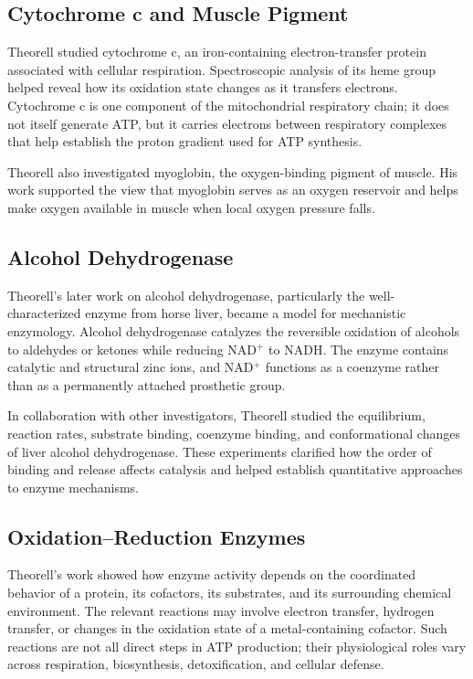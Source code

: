\subsection{Cytochrome c and Muscle Pigment}

Theorell studied cytochrome c, an iron-containing electron-transfer protein associated with cellular respiration. Spectroscopic analysis of its heme group helped reveal how its oxidation state changes as it transfers electrons. Cytochrome c is one component of the mitochondrial respiratory chain; it does not itself generate ATP, but it carries electrons between respiratory complexes that help establish the proton gradient used for ATP synthesis.

Theorell also investigated myoglobin, the oxygen-binding pigment of muscle. His work supported the view that myoglobin serves as an oxygen reservoir and helps make oxygen available in muscle when local oxygen pressure falls.

\subsection{Alcohol Dehydrogenase}

Theorell's later work on alcohol dehydrogenase, particularly the well-characterized enzyme from horse liver, became a model for mechanistic enzymology. Alcohol dehydrogenase catalyzes the reversible oxidation of alcohols to aldehydes or ketones while reducing NAD$^+$ to NADH. The enzyme contains catalytic and structural zinc ions, and NAD$^+$ functions as a coenzyme rather than as a permanently attached prosthetic group.

In collaboration with other investigators, Theorell studied the equilibrium, reaction rates, substrate binding, coenzyme binding, and conformational changes of liver alcohol dehydrogenase. These experiments clarified how the order of binding and release affects catalysis and helped establish quantitative approaches to enzyme mechanisms.

\subsection{Oxidation--Reduction Enzymes}

Theorell's work showed how enzyme activity depends on the coordinated behavior of a protein, its cofactors, its substrates, and its surrounding chemical environment. The relevant reactions may involve electron transfer, hydrogen transfer, or changes in the oxidation state of a metal-containing cofactor. Such reactions are not all direct steps in ATP production; their physiological roles vary across respiration, biosynthesis, detoxification, and cellular defense.

